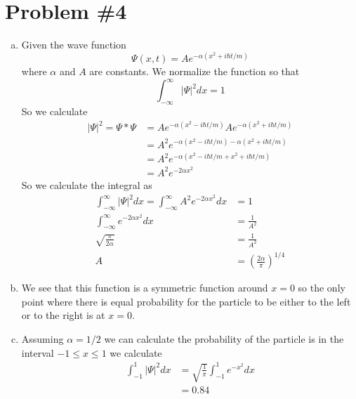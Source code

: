 \documentclass[11pt]{article}
\numberwithin{equation}{section}
\begin{document}
\section{Problem \#4}
\begin{enumerate}[(a)]
\item
Given the wave function
$$\Psi(x,t) = Ae^{-\alpha(x^2+i\hbar t/m)}$$
where $\alpha$ and $A$ are constants. We normalize the function so that
$$\int_{-\infty}^{\infty} |\Psi|^2dx = 1$$
So we calculate 
\begin{align*}
|\Psi|^2 = \Psi*\Psi &= Ae^{-\alpha(x^2-i\hbar t/m)}Ae^{-\alpha(x^2+i\hbar t/m)}\\ 
&= A^2e^{-\alpha(x^2-i\hbar t/m)-\alpha(x^2+i\hbar t/m)}\\ 
&= A^2e^{-\alpha(x^2-i\hbar t/m + x^2+i\hbar t/m)}\\ 
&= A^2e^{-2\alpha x^2}
\end{align*}
So we calculate the integral as
\begin{align*}
\int_{-\infty}^{\infty} |\Psi|^2dx = \int_{-\infty}^{\infty}A^2e^{-2\alpha x^2}dx &= 1\\
\int_{-\infty}^{\infty}e^{-2\alpha x^2}dx &= \frac{1}{A^2}\\
\sqrt{\frac{\pi}{2\alpha}} &= \frac{1}{A^2}\\
A &= \left(\frac{2\alpha}{\pi}\right)^{1/4}
\end{align*}

\item
We see that this function is a symmetric function around $x=0$ so the only point where there is equal probability for the particle to be either to the left or to the right is at $x=0$.

\item
Assuming $\alpha = 1/2$ we can calculate the probability of the particle is in the interval $-1\le x\le1$ we calculate
\begin{align*}
\int_{-1}^1|\Psi|^2dx &= \sqrt{\frac{1}{\pi}}\int_{-1}^{1}e^{-x^2}dx\\
&= 0.84
\end{align*}


\end{enumerate}
\end{document}
